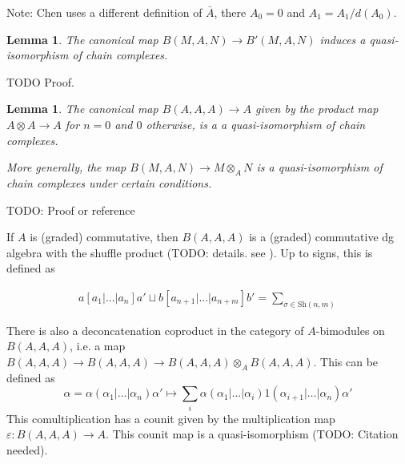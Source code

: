 \documentclass{scrartcl}
\theoremstyle{plain}
\newtheorem{lemma}[theorem]{Lemma}
\theoremstyle{definition}
\newcommand{\shuffle}{\mathbin{\sqcup}}
\begin{document}
Note: Chen uses a different definition of $\bar A$, there $A_0 = 0$ and $A_1 = A_1 / d(A_0)$.

\begin{lemma}
    The canonical map $B(M, A, N)\to B'(M, A, N)$ induces a quasi-isomorphism of chain complexes.
\end{lemma}
TODO Proof.

\begin{lemma}\label{thm:bar_resolution}
    The canonical map $B(A, A, A)\to A$ given by the product map $A\otimes A\to A$ for $n=0$ and $0$ otherwise, is a a quasi-isomorphism of chain complexes.

    More generally, the map $B(M,A,N)\to M\otimes_A N$ is a quasi-isomorphism of chain complexes under certain conditions.
\end{lemma}
TODO: Proof or reference

If $A$ is (graded) commutative, then $B(A, A, A)$ is a (graded) commutative dg algebra with the shuffle product (TODO: details. see \cite[4.1]{chen1973iterated}). Up to signs, this is defined as

\begin{align*}
    a[a_1|\dots|a_n]a' \shuffle b[a_{n+1}|\dots|a_{n+m}]b' = \sum_{\sigma\in\mathrm{Sh}(n, m)}
\end{align*}

There is also a deconcatenation coproduct in the category of $A$-bimodules on $B(A, A, A)$, i.e. a map $B(A, A, A)\to B(A, A, A)\to B(A, A, A)\otimes_A B(A, A, A)$. This can be defined as 
$$\alpha = \alpha(\alpha_1|\dots|\alpha_n)\alpha' \mapsto \sum_i\alpha(\alpha_1|\dots|\alpha_i) 1 (\alpha_{i+1}|\dots|\alpha_n)\alpha'$$
This comultiplication has a counit given by the multiplication map $\varepsilon \colon B(A, A, A)\to A$. This counit map is a quasi-isomorphism (TODO: Citation needed).
\end{document}

